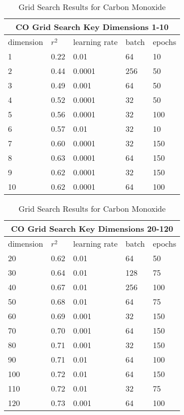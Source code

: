 \documentclass{article}
\begin{document}
\begin{table}[h!]
    \caption{Grid Search Results for Carbon Monoxide}
    \label{tab:table2}
    \vspace{0.1cm}
    \begin{tabular}{p{2cm}p{2cm}p{2cm}p{2cm}p{2cm}}
        \hline
        \multicolumn{5}{c}{CO Grid Search Key Dimensions 1-10}\\
        \hline
        dimension & $r^{2}$ & learning rate & batch & epochs  \\
        1 & 0.22 & 0.01 & 64 & 10 \\
        2 & 0.44 & 0.0001 & 256 & 50\\
        3 & 0.49 & 0.001 & 64 & 50\\
        4 & 0.52 & 0.0001 & 32 & 50\\
        5 & 0.56 & 0.0001 & 32 & 100\\
        6 & 0.57 & 0.01 & 32 & 10\\
        7 & 0.60 & 0.0001 & 32 & 150\\
        8 & 0.63 & 0.0001 & 64 & 150\\
        9 & 0.62 & 0.0001 & 32 & 150\\
        10 & 0.62 & 0.0001 & 64 & 100\\
        \hline
    \end{tabular}
\end{table}
\begin{table}[h!]
    \caption{Grid Search Results for Carbon Monoxide}
    \label{tab:table2}
    \vspace{0.1cm}
    \begin{tabular}{p{2cm}p{2cm}p{2cm}p{2cm}p{2cm}}
        \hline
        \multicolumn{5}{c}{CO Grid Search Key Dimensions 20-120}\\
        \hline
        dimension & $r^{2}$ & learning rate & batch & epochs  \\
        20 & 0.62 & 0.01 & 64 & 50\\
        30 & 0.64 & 0.01 & 128 & 75\\
        40 & 0.67 & 0.01 & 256 & 100\\
        50 & 0.68 & 0.01 & 64 & 75\\
        60 & 0.69 & 0.001 & 32 & 150\\
        70 & 0.70 & 0.001 & 64 & 150\\
        80 & 0.71 & 0.001 & 32 & 150\\
        90 & 0.71 & 0.01 & 64 & 100\\
        100 & 0.72 & 0.01 & 64 & 150\\
        110 & 0.72 & 0.01 & 32 & 75\\
        120 & 0.73 & 0.001 & 64 & 100\\
        \hline
    \end{tabular}
\end{table}
\newpage
\end{document}
